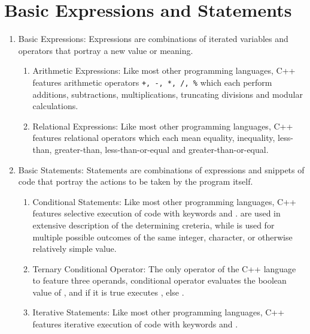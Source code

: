 \section{Basic Expressions and Statements}
\begin{enumerate}
\item Basic Expressions: Expressions are combinations of iterated variables
    and operators that portray a new value or meaning.
    \begin{enumerate}
    \item Arithmetic Expressions: Like most other programming languages, C++
        features arithmetic operators \verb|+, -, *, /, %| which each perform
        additions, subtractions, multiplications, truncating divisions and
        modular calculations. 
    \item Relational Expressions: Like most other programming languages, C++
        features relational operators \imc{==, !=, <, >, <=, >=} which each mean
        equality, inequality, less-than, greater-than, less-than-or-equal and
        greater-than-or-equal. 
    \end{enumerate}
\item Basic Statements: Statements are combinations of expressions and snippets
    of code that portray the actions to be taken by the program itself.
    \begin{enumerate}
    \item Conditional Statements: Like most other programming languages, C++
        features selective execution of code with keywords  and
        .  are used in extensive description of the
        determining creteria, while  is used for multiple possible
        outcomes of the same integer, character, or otherwise relatively simple
        value. 
    \item Ternary Conditional Operator: The only operator of the C++ language to
        feature three operands, conditional operator 
        evaluates the boolean value of , and if it is true executes
        , else . 
    \item Iterative Statements: Like most other programming languages, C++
        features iterative execution of code with keywords  and
        .
    \end{enumerate}
\end{enumerate}

